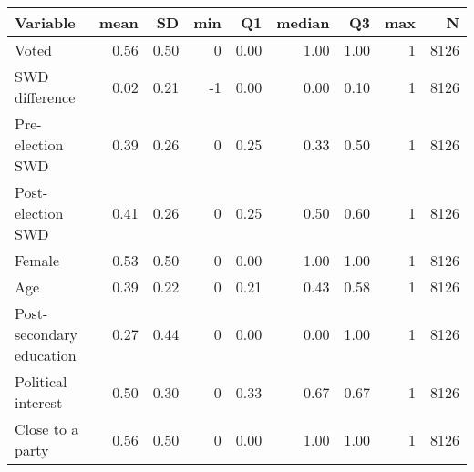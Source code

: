 
\begin{tabular}{l|r|r|r|r|r|r|r|r}
\hline
Variable & mean & SD & min & Q1 & median & Q3 & max & N\\
\hline
Voted & 0.56 & 0.50 & 0 & 0.00 & 1.00 & 1.00 & 1 & 8126\\
\hline
SWD difference & 0.02 & 0.21 & -1 & 0.00 & 0.00 & 0.10 & 1 & 8126\\
\hline
Pre-election SWD & 0.39 & 0.26 & 0 & 0.25 & 0.33 & 0.50 & 1 & 8126\\
\hline
Post-election SWD & 0.41 & 0.26 & 0 & 0.25 & 0.50 & 0.60 & 1 & 8126\\
\hline
Female & 0.53 & 0.50 & 0 & 0.00 & 1.00 & 1.00 & 1 & 8126\\
\hline
Age & 0.39 & 0.22 & 0 & 0.21 & 0.43 & 0.58 & 1 & 8126\\
\hline
Post-secondary education & 0.27 & 0.44 & 0 & 0.00 & 0.00 & 1.00 & 1 & 8126\\
\hline
Political interest & 0.50 & 0.30 & 0 & 0.33 & 0.67 & 0.67 & 1 & 8126\\
\hline
Close to a party & 0.56 & 0.50 & 0 & 0.00 & 1.00 & 1.00 & 1 & 8126\\
\hline
\end{tabular}
